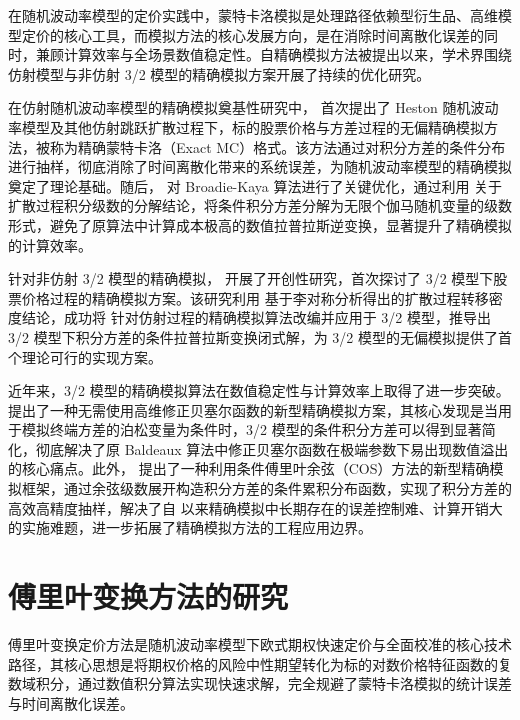 在随机波动率模型的定价实践中，蒙特卡洛模拟是处理路径依赖型衍生品、高维模型定价的核心工具，而模拟方法的核心发展方向，是在消除时间离散化误差的同时，兼顾计算效率与全场景数值稳定性。自精确模拟方法被提出以来，学术界围绕仿射模型与非仿射 3/2 模型的精确模拟方案开展了持续的优化研究。

在仿射随机波动率模型的精确模拟奠基性研究中，\citet{broadieExactSimulationStochastic2006} 首次提出了 Heston 随机波动率模型及其他仿射跳跃扩散过程下，标的股票价格与方差过程的无偏精确模拟方法，被称为精确蒙特卡洛（Exact MC）格式。该方法通过对积分方差的条件分布进行抽样，彻底消除了时间离散化带来的系统误差，为随机波动率模型的精确模拟奠定了理论基础。随后，\citet{glassermanGammaExpansionHeston2011} 对 Broadie-Kaya 算法进行了关键优化，通过利用 \citet{pitmanDecompositionBesselBridges1982} 关于扩散过程积分级数的分解结论，将条件积分方差分解为无限个伽马随机变量的级数形式，避免了原算法中计算成本极高的数值拉普拉斯逆变换，显著提升了精确模拟的计算效率。

针对非仿射 3/2 模型的精确模拟，\citet{baldeauxEXACTSIMULATION322012} 开展了开创性研究，首次探讨了 3/2 模型下股票价格过程的精确模拟方案。该研究利用 \citet{craddockCalculationExpectationsClasses2009} 基于李对称分析得出的扩散过程转移密度结论，成功将 \citet{broadieExactSimulationStochastic2006} 针对仿射过程的精确模拟算法改编并应用于 3/2 模型，推导出 3/2 模型下积分方差的条件拉普拉斯变换闭式解，为 3/2 模型的无偏模拟提供了首个理论可行的实现方案。

近年来，3/2 模型的精确模拟算法在数值稳定性与计算效率上取得了进一步突破。\citet{choiSimulationSchemesHeston2024} 提出了一种无需使用高维修正贝塞尔函数的新型精确模拟方案，其核心发现是当用于模拟终端方差的泊松变量为条件时，3/2 模型的条件积分方差可以得到显著简化，彻底解决了原 Baldeaux 算法中修正贝塞尔函数在极端参数下易出现数值溢出的核心痛点。此外，\citet{brignoneExactSimulationStochastic2026} 提出了一种利用条件傅里叶余弦（COS）方法的新型精确模拟框架，通过余弦级数展开构造积分方差的条件累积分布函数，实现了积分方差的高效高精度抽样，解决了自 \citet{broadieExactSimulationStochastic2006} 以来精确模拟中长期存在的误差控制难、计算开销大的实施难题，进一步拓展了精确模拟方法的工程应用边界。

\section{傅里叶变换方法的研究}

傅里叶变换定价方法是随机波动率模型下欧式期权快速定价与全面校准的核心技术路径，其核心思想是将期权价格的风险中性期望转化为标的对数价格特征函数的复数域积分，通过数值积分算法实现快速求解，完全规避了蒙特卡洛模拟的统计误差与时间离散化误差。

